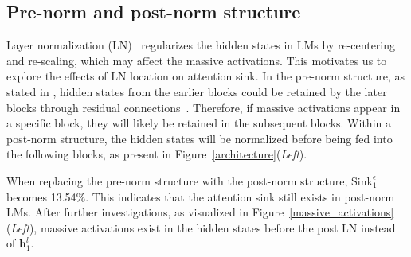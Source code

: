 
\vspace{-0.2cm}
\subsection{Pre-norm and post-norm structure} 
\vspace{-0.2cm}
Layer normalization (LN)~\citep{ba2016layernormalization,zhang2019root} regularizes the hidden states in LMs by re-centering and re-scaling, which may affect the massive activations. This motivates us to explore the effects of LN location on attention sink. In the pre-norm structure, as stated in , hidden states from the earlier blocks could be retained by the later blocks through residual connections~\citep{he2016deep}.  Therefore, if massive activations appear in a specific block, they will likely be retained in the subsequent blocks. Within a post-norm structure, the hidden states will be normalized before being fed into the following blocks, as present in Figure~\ref{architecture}(\emph{Left}). 

When replacing the pre-norm structure with the post-norm structure, $\textrm{Sink}_1^{\epsilon}$ becomes 13.54\%. This indicates that the attention sink still exists in post-norm LMs. After further investigations, as visualized in Figure~\ref{massive_activations}(\emph{Left}), massive activations exist in the hidden states before the post LN instead of $\boldsymbol{h}_1^{l}$. 


